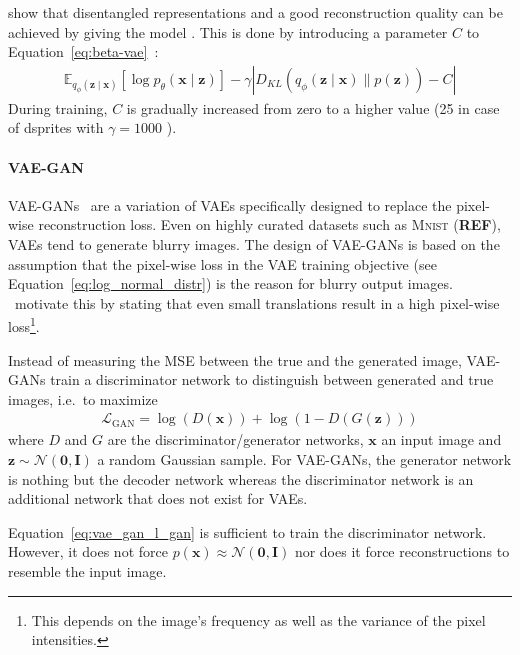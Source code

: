 \citet{burgess2018understanding} show that disentangled representations and a good reconstruction quality can be achieved by giving the model .
This is done by introducing a parameter $C$ to Equation~\ref{eq:beta-vae}~\citep{burgess2018understanding}:
\begin{align}
    \mathbb{E}_{q_{\phi}(\mathbf{z} \mid \bm{x})}\left[\log p_{\theta}(\bm{x} \mid \bm{z})\right]-\gamma\left|D_{K L}\left(q_{\phi}(\bm{z} \mid \bm{x}) \| p(\bm{z})\right)-C\right|
\end{align}
During training, $C$ is gradually increased from zero to a higher value (25 in case of dsprites with $\gamma=1000$ \citep{burgess2018understanding}).

\paragraph{\ac{VAE}-\ac{GAN}}
\ac{VAE}-\acp{GAN}~\citep{larsen2015autoencoding} are a variation of \acp{VAE} specifically designed to replace the pixel-wise reconstruction loss.
Even on highly curated datasets such as \textsc{Mnist} (\textbf{REF}), \acp{VAE} tend to generate blurry images.
The design of \ac{VAE}-\acp{GAN} is based on the assumption that the pixel-wise loss in the \ac{VAE} training objective (see Equation~\ref{eq:log_normal_distr}) is the reason for blurry output images.
\citet{larsen2015autoencoding}~motivate this by stating that even small translations result in a high pixel-wise loss\footnote{This depends on the image's frequency as well as the variance of the pixel intensities.}.

Instead of measuring the \ac{MSE} between the true and the generated image, \ac{VAE}-\acp{GAN} train a discriminator network to distinguish between generated and true images, i.e.~to maximize
\begin{align}
    \mathcal{L}_{\mathrm{GAN}}=\log (D(\bm{x}))+\log (1-D(G(\bm{z}))) \label{eq:vae_gan_l_gan}
\end{align}
where $D$ and $G$ are the discriminator/generator networks, $\bm{x}$ an input image and $\bm{z}\sim \mathcal{N}(\bm{0},\bm{I})$ a random Gaussian sample.
For \ac{VAE}-\acp{GAN}, the generator network is nothing but the decoder network whereas the discriminator network is an additional network that does not exist for \acp{VAE}.

Equation~\ref{eq:vae_gan_l_gan} is sufficient to train the discriminator network.
However, it does not force $p(\bm{x}) \approx \mathcal{N}(\bm{0},\bm{I})$ nor does it force reconstructions to resemble the input image.


